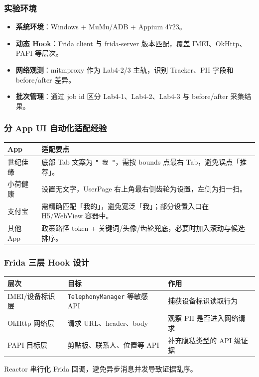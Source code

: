\documentclass[AutoFakeBold,AutoFakeSlant]{beamer}
\newcommand{\code}[1]{\texttt{#1}}
\begin{document}
\begin{frame}
    \frametitle{实验环境}
    \small
    \begin{itemize}
        \item \textbf{系统环境}：Windows + MuMu/ADB + Appium 4723。
        \item \textbf{动态 Hook}：Frida client 与 frida-server 版本匹配，覆盖 IMEI、OkHttp、PAPI 等层次。
        \item \textbf{网络观测}：mitmproxy 作为 Lab4-2/3 主轨，识别 Tracker、PII 字段和 before/after 差异。
        \item \textbf{批次管理}：通过 job id 区分 Lab4-1、Lab4-2、Lab4-3 与 before/after 采集结果。
    \end{itemize}
\end{frame}

\begin{frame}
    \frametitle{分 App UI 自动化适配经验}
    \scriptsize
    \begin{tabularx}{\textwidth}{|l|X|}
        \hline
        \textbf{App} & \textbf{适配要点} \\
        \hline
        世纪佳缘 & 底部 Tab 文案为 \code{" 我 "}，需按 bounds 点最右 Tab，避免误点「推荐」。 \\
        \hline
        小荷健康 & 设置无文字，UserPage 右上角最右侧齿轮为设置，左侧为扫一扫。 \\
        \hline
        支付宝 & 需精确匹配「我的」，避免宽泛「我」；部分设置入口在 H5/WebView 容器中。 \\
        \hline
        其他 App & 政策路径 token + 关键词/头像/齿轮兜底，必要时加入滚动与候选排序。 \\
        \hline
    \end{tabularx}
\end{frame}

\begin{frame}
    \frametitle{Frida 三层 Hook 设计}
    \small
    \begin{tabularx}{\textwidth}{|l|X|X|}
        \hline
        \textbf{层次} & \textbf{目标} & \textbf{作用} \\
        \hline
        IMEI/设备标识层 & \code{TelephonyManager} 等敏感 API & 捕获设备标识读取行为 \\
        \hline
        OkHttp 网络层 & 请求 URL、header、body & 观察 PII 是否进入网络请求 \\
        \hline
        PAPI 目标层 & 剪贴板、联系人、位置等 API & 补充隐私类型的 API 级证据 \\
        \hline
    \end{tabularx}
    \vspace{0.5em}
    \scriptsize
    Reactor 串行化 Frida 回调，避免异步消息并发导致证据乱序。
\end{frame}
\end{document}
